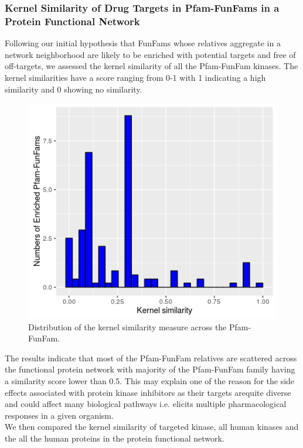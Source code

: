 \documentclass[a4paper, 11pt]{article}
\begin{document}
\subsubsection*{Kernel Similarity of Drug Targets in Pfam-FunFams in a Protein Functional Network}
Following our initial hypothesis that FunFams whose relatives aggregate in a network neighborhood are likely to be enriched with potential targets and free of off-targets, we assessed the kernel similarity of all the Pfam-FunFam kinases.  The kernel similarities have a score ranging from 0-1 with 1 indicating a high similarity and 0 showing no similarity. 
\begin{figure}[H]
	\includegraphics[width=.8\linewidth]{figures/ksim_plot.png}
	\centering
	\caption{Distribution of the kernel similarity measure across the Pfam-FunFam.}
	\label{ksim_plot}
\end{figure}
The results indicate that most of the Pfam-FunFam relatives are scattered across the functional protein network with majority of the Pfam-FunFam family having a similarity score lower than 0.5. This may explain one of the reason for the side effects associated with protein kinase inhibitors as their targets arequite diverse and could affect many biological pathways i.e. elicits multiple pharmacological responses in a given organism.\\
We then compared the kernel similarity of targeted kinase, all human kinases and the all the human proteins in the protein functional network. 
\end{document}
